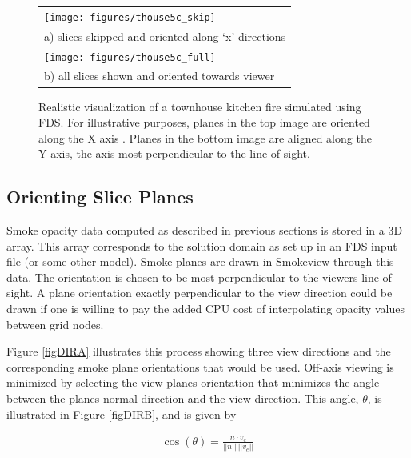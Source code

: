 \begin{figure}[\figoptions]
\begin{center}
\begin{tabular}{l}
\texttt{[image: figures/thouse5c\_skip]}\\
a) slices skipped and oriented along `x' directions\\
\texttt{[image: figures/thouse5c\_full]}\\
b) all slices shown and oriented towards viewer \\
\end{tabular}
\end{center}
\caption[Realistic visualization of a townhouse kitchen fire simulated using FDS.]{Realistic visualization of a townhouse kitchen fire simulated using FDS. For illustrative purposes, planes in the top image are oriented along the X axis .  Planes in the bottom image are aligned along the Y axis, the axis most perpendicular to the line of sight.}
\label{figsmoke3d}%
\end{figure}


\subsection{Orienting Slice Planes}

Smoke opacity data computed as described in previous sections is stored in a 3D array. This array corresponds to the solution domain as set up in an FDS input file (or some other model). Smoke planes are drawn in Smokeview through this data.  The orientation is chosen to be most perpendicular to the viewers line of sight. A plane orientation exactly perpendicular to the view direction could be drawn if one is willing to pay the added CPU cost of interpolating opacity values between grid nodes.

Figure \ref{figDIRA} illustrates this process showing three view directions and the corresponding smoke plane orientations that would be used. Off-axis viewing is minimized by selecting the view planes orientation that minimizes the angle between the planes normal direction and the view direction. This angle, $\theta$, is illustrated in Figure \ref{figDIRB}, and is given by

\begin{eqnarray*}
\cos(\theta)=\frac{n\cdot v_e}{||n||~||v_e||}
\end{eqnarray*}

